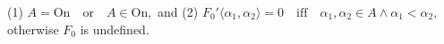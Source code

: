 (1) $A = \text{On} \quad \text{or} \quad A \in \text{On},$
and
(2) $F_0' \langle \alpha_1, \alpha_2 \rangle = 0 \quad \text{iff} \quad \alpha_1, \alpha_2 \in A \land \alpha_1 < \alpha_2,$
otherwise $F_0$ is undefined.
